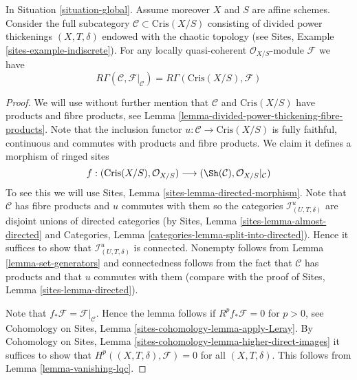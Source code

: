 \begin{lemma}
\label{lemma-compare}
In Situation \ref{situation-global}.
Assume moreover $X$ and $S$ are affine schemes.
Consider the full subcategory $\mathcal{C} \subset \text{Cris}(X/S)$
consisting of divided power thickenings $(X, T, \delta)$
endowed with the chaotic topology (see
Sites, Example \ref{sites-example-indiscrete}).
For any locally quasi-coherent $\mathcal{O}_{X/S}$-module $\mathcal{F}$
we have
$$
R\Gamma(\mathcal{C}, \mathcal{F}|_\mathcal{C}) =
R\Gamma(\text{Cris}(X/S), \mathcal{F})
$$
\end{lemma}

\begin{proof}
We will use without further mention that $\mathcal{C}$ and $\text{Cris}(X/S)$
have products and fibre products, see
Lemma \ref{lemma-divided-power-thickening-fibre-products}.
Note that the inclusion functor $u : \mathcal{C} \to \text{Cris}(X/S)$
is fully faithful, continuous and commutes with products and fibre products.
We claim it defines a morphism of ringed sites
$$
f :
(\text{Cris}(X/S), \mathcal{O}_{X/S})
\longrightarrow
(\Sh(\mathcal{C}), \mathcal{O}_{X/S}|_\mathcal{C})
$$
To see this we will use Sites, Lemma \ref{sites-lemma-directed-morphism}.
Note that $\mathcal{C}$ has fibre products and $u$ commutes with them
so the categories $\mathcal{I}^u_{(U, T, \delta)}$ are disjoint unions
of directed categories (by Sites, Lemma \ref{sites-lemma-almost-directed} and
Categories, Lemma \ref{categories-lemma-split-into-directed}). Hence it
suffices to show that $\mathcal{I}^u_{(U, T, \delta)}$ is connected.
Nonempty follows from Lemma \ref{lemma-set-generators}
and connectedness follows from the fact that $\mathcal{C}$ has products
and that $u$ commutes with them (compare with the proof of
Sites, Lemma \ref{sites-lemma-directed}).

\medskip\noindent
Note that $f_*\mathcal{F} = \mathcal{F}|_\mathcal{C}$. Hence the lemma
follows if $R^pf_*\mathcal{F} = 0$ for $p > 0$, see
Cohomology on Sites, Lemma \ref{sites-cohomology-lemma-apply-Leray}. By
Cohomology on Sites, Lemma \ref{sites-cohomology-lemma-higher-direct-images}
it suffices to show that $H^p((X, T, \delta), \mathcal{F}) = 0$ for all
$(X, T, \delta)$. This follows from Lemma \ref{lemma-vanishing-lqc}.
\end{proof}

